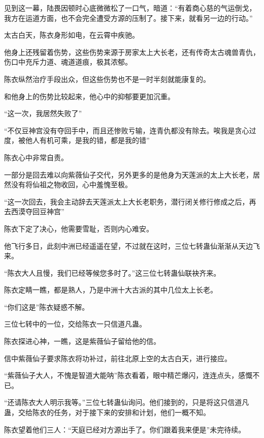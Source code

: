 \begin{this_body}
见到这一幕，陆畏因顿时心底微微松了一口气，暗道：“有着商心慈的气运倒戈，我方在运道方面，也不会完全遭受方源的压制了。接下来，就看另一边的行动。”

太古白天，陈衣身形如电，在云霄中疾驰。

他身上还残留着伤势，这些伤势来源于房家太上大长老，还有传奇太古魂兽青仇，伤口中充斥力道、魂道道痕，极其浓郁。

陈衣纵然治疗手段出众，但这些伤势也不是一时半刻就能康复的。

和他身上的伤势比较起来，他心中的抑郁要更加沉重。

“这一次，我居然失败了”

“不仅豆神宫没有夺回手中，而且还惨败亏输，连青仇都没有除去。唉我是贪心过度，被他人有机可乘，是我的错，都是我的错”

陈衣心中非常自责。

一部分是回去难以向紫薇仙子交代，另外更多的是他身为天莲派的太上大长老，居然没有将仙祖之物收回，心中羞愧至极。

“这一次回去，我会主动辞去天莲派太上大长老职务，潜行闭关修行修成之后，再去西漠夺回豆神宫”

陈衣下定了决心，他需要雪耻，否则内心难安。

他飞行多日，此刻中洲已经遥遥在望，不过就在这时，三位七转蛊仙渐渐从天边飞来。

“陈衣大人且慢，我们已经等候您多时了。”这三位七转蛊仙联袂齐来。

陈衣定睛一瞧，都是熟人，乃是中洲十大古派的其中几位太上长老。

“你们这是”陈衣疑惑不解。

三位七转中的一位，交给陈衣一只信道凡蛊。

陈衣探进心神，一瞧，这是紫薇仙子留给他的信。

信中紫薇仙子要求陈衣将功补过，前往北原上空的太古白天，进行接应。

“紫薇仙子大人，不愧是智道大能呐”陈衣看着，眼中精芒爆闪，连连点头，感慨不已。

“还请陈衣大人明示我等。”三位七转蛊仙询问。他们接到的，只是将这只信道凡蛊，交给陈衣的任务，对于接下来的安排和计划，他们一概不知。

陈衣望着他们三人：“天庭已经对方源出手了。你们跟着我来便是”未完待续。

\end{this_body}

